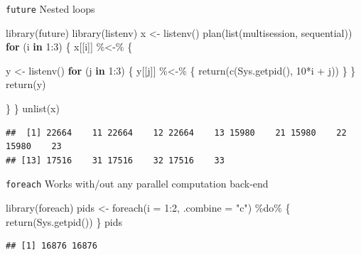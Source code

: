 \documentclass[
  ignorenonframetext,
  usenames,
  dvipsnames]{beamer}
\newenvironment{Shaded}{\begin{snugshade}}{\end{snugshade}}
\newcommand{\AttributeTok}[1]{\textcolor[rgb]{0.77,0.63,0.00}{#1}}
\newcommand{\ControlFlowTok}[1]{\textcolor[rgb]{0.13,0.29,0.53}{\textbf{#1}}}
\newcommand{\DecValTok}[1]{\textcolor[rgb]{0.00,0.00,0.81}{#1}}
\newcommand{\FunctionTok}[1]{\textcolor[rgb]{0.00,0.00,0.00}{#1}}
\newcommand{\NormalTok}[1]{#1}
\newcommand{\OtherTok}[1]{\textcolor[rgb]{0.56,0.35,0.01}{#1}}
\newcommand{\SpecialCharTok}[1]{\textcolor[rgb]{0.00,0.00,0.00}{#1}}
\newcommand{\StringTok}[1]{\textcolor[rgb]{0.31,0.60,0.02}{#1}}
\begin{document}
\begin{frame}[fragile]{\texttt{future} Nested loops}
\protect\hypertarget{future-nested-loops}{}
\tiny

\begin{Shaded}
\begin{Highlighting}[]
\FunctionTok{library}\NormalTok{(future)}
\FunctionTok{library}\NormalTok{(listenv)}
\NormalTok{x }\OtherTok{\textless{}{-}} \FunctionTok{listenv}\NormalTok{()}
\FunctionTok{plan}\NormalTok{(}\FunctionTok{list}\NormalTok{(multisession, sequential))}
\ControlFlowTok{for}\NormalTok{ (i }\ControlFlowTok{in} \DecValTok{1}\SpecialCharTok{:}\DecValTok{3}\NormalTok{) \{}
\NormalTok{  x[[i]] }\SpecialCharTok{\%\textless{}{-}\%}\NormalTok{ \{}
    
\NormalTok{    y }\OtherTok{\textless{}{-}} \FunctionTok{listenv}\NormalTok{()}
    \ControlFlowTok{for}\NormalTok{ (j }\ControlFlowTok{in} \DecValTok{1}\SpecialCharTok{:}\DecValTok{3}\NormalTok{) \{}
\NormalTok{      y[[j]] }\SpecialCharTok{\%\textless{}{-}\%}\NormalTok{ \{}
        \FunctionTok{return}\NormalTok{(}\FunctionTok{c}\NormalTok{(}\FunctionTok{Sys.getpid}\NormalTok{(), }\DecValTok{10}\SpecialCharTok{*}\NormalTok{i }\SpecialCharTok{+}\NormalTok{ j))}
\NormalTok{      \}}
\NormalTok{    \}}
    \FunctionTok{return}\NormalTok{(y)}
    
\NormalTok{  \}}
\NormalTok{\}}
\FunctionTok{unlist}\NormalTok{(x)}
\end{Highlighting}
\end{Shaded}

\begin{verbatim}
##  [1] 22664    11 22664    12 22664    13 15980    21 15980    22 15980    23
## [13] 17516    31 17516    32 17516    33
\end{verbatim}

\normalsize
\end{frame}

\begin{frame}[fragile]{\texttt{foreach}}
\protect\hypertarget{foreach}{}
Works with/out any parallel computation back-end

\begin{Shaded}
\begin{Highlighting}[]
\FunctionTok{library}\NormalTok{(foreach)}
\NormalTok{pids }\OtherTok{\textless{}{-}} \FunctionTok{foreach}\NormalTok{(}\AttributeTok{i =} \DecValTok{1}\SpecialCharTok{:}\DecValTok{2}\NormalTok{, }\AttributeTok{.combine =} \StringTok{"c"}\NormalTok{) }\SpecialCharTok{\%do\%}\NormalTok{ \{}
  \FunctionTok{return}\NormalTok{(}\FunctionTok{Sys.getpid}\NormalTok{())}
\NormalTok{\}}
\NormalTok{pids}
\end{Highlighting}
\end{Shaded}

\begin{verbatim}
## [1] 16876 16876
\end{verbatim}
\end{frame}
\end{document}
